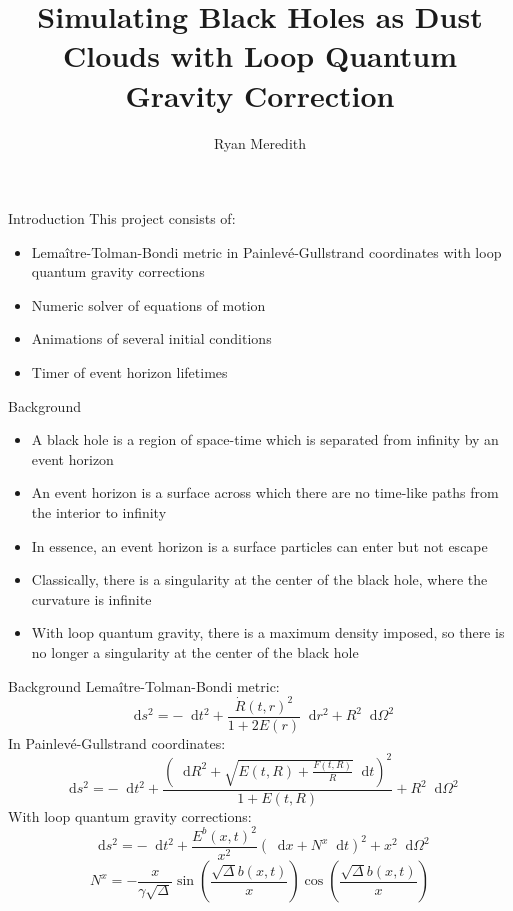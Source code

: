 \documentclass[12pt]{beamer}
\title[Simulating Black Holes]{Simulating Black Holes as Dust Clouds with Loop Quantum
Gravity Correction}
\author{Ryan Meredith}
\newcommand{\dd}{\mathop{}\!\mathrm{d}}
\begin{document}
\frame{\titlepage}

\begin{frame}{Introduction}
    This project consists of:
    \begin{itemize}
        \item Lema\^{i}tre-Tolman-Bondi metric in Painlev\'{e}-Gullstrand coordinates
            with loop quantum gravity corrections
        \item Numeric solver of equations of motion
        \item Animations of several initial conditions
        \item Timer of event horizon lifetimes
    \end{itemize}
\end{frame}

\begin{frame}{Background}
    \begin{itemize}
        \item A black hole is a region of space-time which is separated from infinity by
            an event horizon
        \item An event horizon is a surface across which there are no time-like paths
            from the interior to infinity
        \item In essence, an event horizon is a surface particles can enter but not
            escape
        \item Classically, there is a singularity at the center of the black hole, where
            the curvature is infinite
        \item With loop quantum gravity, there is a maximum density imposed, so there is
            no longer a singularity at the center of the black hole
    \end{itemize}
\end{frame}

\begin{frame}{Background}
    Lema\^{i}tre-Tolman-Bondi metric:
    \[ \dd s^2 = -\dd t^2 + \frac{\dot{R}(t,r)^2}{1 + 2E(r)} \dd r^2 + R^2\dd \Omega^2 \]
    In Painlev\'{e}-Gullstrand coordinates:
    \[ \dd s^2 = -\dd t^2 + \frac{\left(\dd R^2 + \sqrt{E(t,R) + \frac{F(t,R)}{R}}\dd
    t\right)^2} {1 + E(t,R)} + R^2\dd \Omega^2 \]
    With loop quantum gravity corrections:
    \[ \dd s^2 = -\dd t^2 + \frac{E^b(x,t)^2}{x^2} (\dd x + N^x\dd t)^2 + x^2 \dd
    \Omega^2 \]
    \[ N^x = -\frac{x}{\gamma\sqrt{\Delta}}
    \sin\left(\frac{\sqrt{\Delta}b(x,t)}{x}\right)
    \cos\left(\frac{\sqrt{\Delta}b(x,t)}{x}\right) \]
\end{frame}
\end{document}
